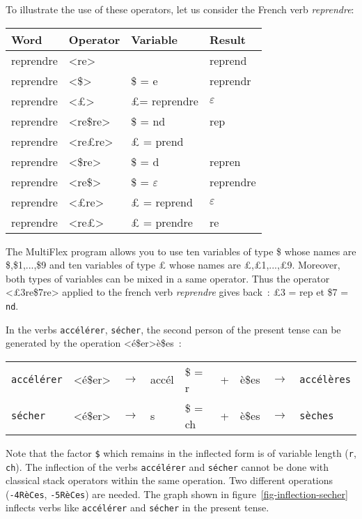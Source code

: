\noindent
To illustrate the use of these operators, let us consider the French verb {\it reprendre}:

\bigskip
\begin{center}
\begin{tabular}{|l|l|l|l|}
\hline
Word     & Operator & Variable & Result\\
\hline
\hline
reprendre & <re> & & reprend\\
reprendre & <\$> & \$ = e & reprendr\\
reprendre & <{\pounds}> &{\pounds}= reprendre & $\varepsilon$ \\
reprendre & <re\$re> & \$ = nd & rep\\
reprendre & <re{\pounds}re> & {\pounds} = prend & \\
reprendre & <\$re> & \$ = d & repren\\
reprendre & <re\$> & \$ =  $\varepsilon$ & reprendre\\
reprendre & <{\pounds}re> & {\pounds} = reprend & $\varepsilon$\\
reprendre & <re{\pounds}> & {\pounds} = prendre & re\\
\hline
\end{tabular}
\end{center}

\bigskip
\noindent
The MultiFlex program allows you to use ten variables of type \$ whose names are \$,\$1,...,\$9
and ten variables of type {\pounds} whose names are {\pounds},{\pounds}1,...,{\pounds}9.
Moreover, both types of variables can be mixed in a same operator. Thus the operator <{\pounds}3re\$7re>
applied to the french verb {\it reprendre} gives back~: {\pounds}3 = rep et \$7 = \verb+nd+.

\bigskip
\noindent
In the verbs \verb+accélérer+, \verb+sécher+, the second person of the present tense
can be generated by the operation <é\$er>è\$es~:

\begin{center}
\begin{tabular}{lllllllll}
	\verb+accélérer+ & <é\$er> & $\rightarrow$ & accél & \$ = r & + & è\$es &  $\rightarrow$ & \verb+accélères+\\
	\verb+sécher+ & <é\$er> & $\rightarrow$ & s & \$ = ch & + & è\$es & $\rightarrow$ & \verb+sèches+\\
\end{tabular}
\end{center}

\noindent
Note that the factor \verb+$+ which remains in the inflected form is of variable length (\verb+r+, \verb+ch+). 
The inflection of the verbs \verb+accélérer+ and \verb+sécher+ cannot be done with classical stack operators
within the same operation. Two different operations (\verb+-4RèCes+, \verb+-5RèCes+) are
needed. The graph shown in figure~\ref{fig-inflection-secher} inflects verbs like
\verb+accélérer+ and \verb+sécher+ in the present tense.


